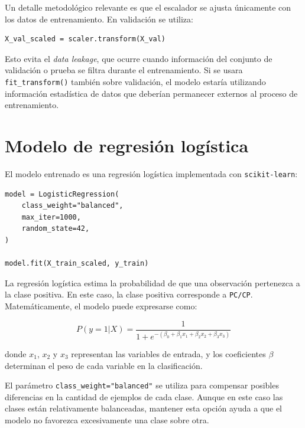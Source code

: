 \documentclass[12pt,letterpaper]{article}
\begin{document}
Un detalle metodológico relevante es que el escalador se ajusta únicamente con los datos de entrenamiento. En validación se utiliza:

\begin{lstlisting}[style=pythonstyle, caption={Transformación del conjunto de validación}]
X_val_scaled = scaler.transform(X_val)
\end{lstlisting}

Esto evita el \textit{data leakage}, que ocurre cuando información del conjunto de validación o prueba se filtra durante el entrenamiento. Si se usara \texttt{fit\_transform()} también sobre validación, el modelo estaría utilizando información estadística de datos que deberían permanecer externos al proceso de entrenamiento.

\section{Modelo de regresión logística}

El modelo entrenado es una regresión logística implementada con \texttt{scikit-learn}:

\begin{lstlisting}[style=pythonstyle, caption={Entrenamiento del modelo}]
model = LogisticRegression(
    class_weight="balanced",
    max_iter=1000,
    random_state=42,
)

model.fit(X_train_scaled, y_train)
\end{lstlisting}

La regresión logística estima la probabilidad de que una observación pertenezca a la clase positiva. En este caso, la clase positiva corresponde a \texttt{PC/CP}. Matemáticamente, el modelo puede expresarse como:

\begin{equation}
P(y=1|X)=\frac{1}{1+e^{-(\beta_0+\beta_1x_1+\beta_2x_2+\beta_3x_3)}}
\end{equation}

donde $x_1$, $x_2$ y $x_3$ representan las variables de entrada, y los coeficientes $\beta$ determinan el peso de cada variable en la clasificación.

El parámetro \texttt{class\_weight="balanced"} se utiliza para compensar posibles diferencias en la cantidad de ejemplos de cada clase. Aunque en este caso las clases están relativamente balanceadas, mantener esta opción ayuda a que el modelo no favorezca excesivamente una clase sobre otra.
\end{document}
